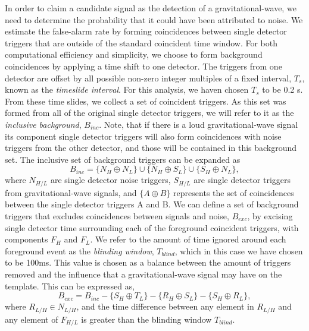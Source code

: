 In order to claim a candidate signal as the detection of a gravitational-wave, we need to determine the probability that it could have been attributed to noise. We estimate the false-alarm rate by forming coincidences between single detector triggers that are outside of the standard coincident time window. For both computational efficiency and simplicity, we choose to form background coincidences by applying a time shift to one detector. The triggers from one detector are offset by all possible non-zero integer multiples of a fixed interval, $T_s$, known as the \emph{timeslide interval}. For this analysis, we haven chosen $T_s$ to be 0.2 s. From these time slides, we collect a set of coincident triggers. As this set was formed from all of the original single detector triggers, we will refer to it as the \textit{inclusive background}, $B_{inc}$. Note, that if there is a loud gravitational-wave signal its component single detector triggers will also form coincidences with noise triggers from the other detector, and those will be contained in this background set. The inclusive set of background triggers can be expanded as
%
\begin{equation}
B_{inc} = \{N_H \oplus N_L\} \cup \{ N_H \oplus S_L \} \cup \{S_H \oplus N_L\},
\end{equation}
where $N_{H/L}$ are single detector noise triggers, $S_{H/L}$ are single detector triggers from gravitational-wave signals, and $\{A \oplus B\}$ represents the set of coincidences between the single detector triggers A and B. We can define a set of background triggers that excludes coincidences between signals and noise, $B_{exc}$, by excising single detector time surrounding each of the foreground coincident triggers, with components $F_H$ and $F_L$. We refer to the amount of time ignored around each foreground event as the \emph{blinding window}, $T_{blind}$, which in this case we have chosen to be 100ms. This value is chosen as a balance between the amount of triggers removed and the influence that a gravitational-wave signal may have on the template.  This can be expressed as,
%
\begin{equation}
B_{exc} = B_{inc} - \{S_H \oplus T_L\} - \{R_H \oplus S_L\} - \{S_H \oplus R_L\},
\end{equation}
%
where $R_{L/H} \in N_{L/H}$, and the time difference between any element in $R_{L/H}$ and any element of $F_{H/L}$ is greater than the blinding window $T_{blind}$. 

